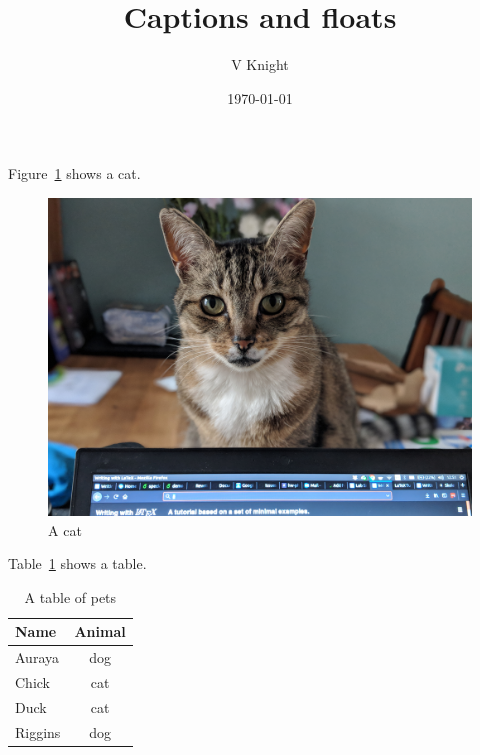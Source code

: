 \documentclass{article}
\title{Captions and floats}
\author{V Knight}
\date{\today}
\begin{document}
 

\maketitle

Figure~\ref{my_picture} shows a cat.

\begin{figure}[!htbp]
    \begin{center}
        \includegraphics[width=.6\textwidth]{cat.jpg}
    \end{center}
    \caption{A cat}
    \label{my_picture}
\end{figure}

Table~\ref{my_table} shows a table.

\begin{table}[!hbtp]
    \begin{center}
        \begin{tabular}{|l|c|}
            \toprule
            Name    & Animal \\
            \midrule
            Auraya  & dog \\
            Chick   & cat \\
            Duck    & cat \\
            Riggins & dog \\
            \bottomrule
        \end{tabular}
    \end{center}
    \caption{A table of pets}
    \label{my_table}
\end{table}
\end{document}
